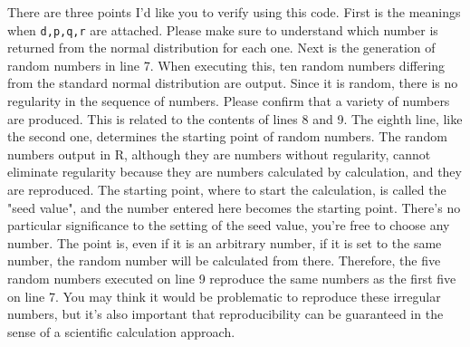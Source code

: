 \documentclass{ltjsbook}
\begin{document}
There are three points I'd like you to verify using this code. First is the meanings when \texttt{d,p,q,r} are attached. Please make sure to understand which number is returned from the normal distribution for each one.
Next is the generation of random numbers in line 7. When executing this, ten random numbers differing from the standard normal distribution are output. Since it is random, there is no regularity in the sequence of numbers. Please confirm that a variety of numbers are produced.
This is related to the contents of lines 8 and 9. The eighth line, like the second one, determines the starting point of random numbers. The random numbers output in R, although they are numbers without regularity, cannot eliminate regularity because they are numbers calculated by calculation, and they are reproduced. The starting point, where to start the calculation, is called the "seed value", and the number entered here becomes the starting point. There's no particular significance to the setting of the seed value, you're free to choose any number. The point is, even if it is an arbitrary number, if it is set to the same number, the random number will be calculated from there. Therefore, the five random numbers executed on line 9 reproduce the same numbers as the first five on line 7.
You may think it would be problematic to reproduce these irregular numbers, but it's also important that reproducibility can be guaranteed in the sense of a scientific calculation approach.
\end{document}
